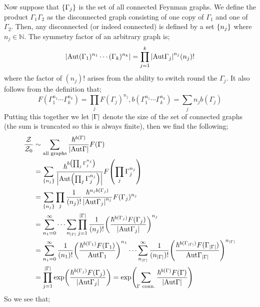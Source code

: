 \paraskip
Now suppose that $\set{\Gamma_j}$ is the set of all connected Feynman graphs. We define the product $\Gamma_1 \Gamma_2$ as the disconnected graph consisting of one copy of $\Gamma_1$ and one of $\Gamma_2$. Then, any disconnected (or indeed connected) is defined by a set $\set{n_j}$ where $n_j \in \mathbb{N}$. The symmetry factor of an arbitrary graph is;
\begin{equation*}
\abs{\text{Aut}(\Gamma_1)^{n_1}\cdots(\Gamma_k)^{n_k}} = \prod_{j = 1}^{k}{\abs{\text{Aut}\Gamma_j}^{n_j}(n_j)!}
\end{equation*}
where the factor of $(n_j)!$ arises from the ability to switch round the $\Gamma_j$. It also follows from the definition that;
\begin{equation*}
F(\Gamma_1^{n_1}\cdots\Gamma_k^{n_k}) = \prod_{j}{F(\Gamma_j)^{n_j}}, b(\Gamma_1^{n_1}\cdots\Gamma_k^{n_k}) = \sum_{j}{n_j b(\Gamma_j)}
\end{equation*}
Putting this together we let $\abs{\Gamma}$ denote the size of the set of connected graphs (the sum is truncated so this is always finite), then we find the following;
\begin{align*}
\frac{\mZ}{\mZ_0} &\sim \sum_{\text{all graphs}}{\frac{\hbar^{b(\Gamma)}}{\abs{\text{Aut}\Gamma}}F(\Gamma)} \\
&= \sum_{\set{n_j}}{\frac{\hbar^{b\left(\prod_{j}{\Gamma_j^{n_j}}\right)}}{\abs{\text{Aut}\left(\prod_{j}{\Gamma_j^{n_j}}\right)}}F\left(\prod_{j}{\Gamma_j^{n_j}}\right)} \\
&= \sum_{\set{n_j}}{\prod_{j}{\frac{1}{(n_j)!}\frac{\hbar^{n_j b(\Gamma_j)}}{\abs{\text{Aut}\Gamma_j}^{n_j}}F(\Gamma_j)^{n_j}}} \\
&= \sum_{n_1 = 0}^{\infty}{\cdots\sum_{n_{\abs{\Gamma}}}{\prod_{j = 1}^{\abs{\Gamma}}{\frac{1}{(n_j)!}\left(\frac{\hbar^{b(\Gamma_j)}F(\Gamma_j)}{\abs{\text{Aut}\Gamma_j}}\right)^{n_j}}}} \\
&= \sum_{n_1 = 0}^{\infty}{\frac{1}{(n_1)!}\left(\frac{\hbar^{b(\Gamma_1)}F(\Gamma_1)}{\text{Aut}\Gamma_1}\right)^{n_1}}\cdots\sum_{n_{\abs{\Gamma}}}^{\infty}{\frac{1}{(n_{\abs{\Gamma}})!}\left(\frac{\hbar^{b(\Gamma_{\abs{\Gamma}})}F(\Gamma_{\abs{\Gamma}})}{\text{Aut}\Gamma_{\abs{\Gamma}}}\right)^{n_{\abs{\Gamma}}}} \\
&= \prod_{j = 1}^{\abs{\Gamma}}{\exp\left(\frac{\hbar^{b(\Gamma_j)}F(\Gamma_j)}{\abs{\text{Aut}\Gamma_j}}\right)} = \exp\left(\sum_{\Gamma\,\,\text{conn.}}{\frac{\hbar^{b(\Gamma)}F(\Gamma)}{\abs{\text{Aut}\Gamma}}}\right)
\end{align*}
So we see that;
